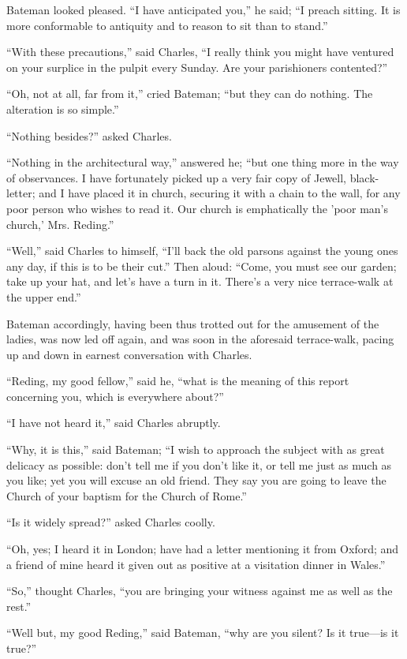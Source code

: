 Bateman looked pleased. ``I have anticipated you,'' he
said; ``I preach sitting. It is more conformable to antiquity and
to reason to sit than to stand.''

``With these precautions,'' said Charles, ``I really
think you might have ventured on your surplice in the pulpit
every Sunday. Are your parishioners contented?''

``Oh, not at all, far from it,'' cried Bateman; ``but
they can do nothing. The alteration is so simple.''

``Nothing besides?'' asked Charles.

``Nothing in the architectural way,'' answered he;
``but one thing more in the way of observances. I have fortunately
picked up a very fair copy of Jewell, black-letter; and I have placed
it in church, securing it with a chain to the wall, for any poor
person who wishes to read it. Our church is emphatically the 'poor man's
church,' Mrs. Reding.''

``Well,'' said Charles to himself, ``I'll back the old
parsons against the young ones any day, if this is to be their
cut.'' Then aloud: ``Come, you must see our garden; take up
your hat, and let's have a turn in it. There's a very nice terrace-walk
at the upper end.''

Bateman accordingly, having been thus trotted out for the amusement
of the ladies, was now led off again, and was soon in the aforesaid
terrace-walk, pacing up and down in earnest conversation with Charles.

``Reding, my good fellow,'' said he, ``what is the
meaning of this report concerning you, which is everywhere
about?''

``I have not heard it,'' said Charles abruptly.

``Why, it is this,'' said Bateman; ``I wish to approach
the subject with as great delicacy as possible: don't tell me if you
don't like it, or tell me just as much as you like; yet you will
excuse an old friend. They say you are going to leave the Church
of your baptism for the Church of Rome.''

``Is it widely spread?'' asked Charles coolly.

``Oh, yes; I heard it in London; have had a letter mentioning
it from Oxford; and a friend of mine heard it given out as positive at
a visitation dinner in Wales.''

``So,'' thought Charles, ``you are bringing your
witness against me as well as the rest.''

``Well but, my good Reding,'' said Bateman, ``why are
you silent? Is it true—is it true?''

